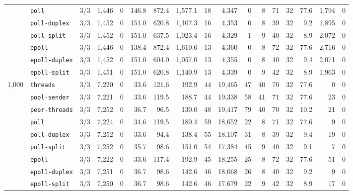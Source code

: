 \begin{longtable}{@{}llrrrrrrrrrrrrrrr@{}}
 & \texttt{poll} & 3/3 & 1{,}446 & 0 & 146.8 & 872.4 & 1{,}577.1 & 18 & 4{,}347 & 0 & 8 & 71 & 32 & 77.6 & 1{,}794 & 0 \\
 & \texttt{poll-duplex} & 3/3 & 1{,}452 & 0 & 151.0 & 620.8 & 1{,}107.3 & 16 & 4{,}353 & 0 & 8 & 39 & 32 & 9.2 & 1{,}895 & 0 \\
 & \texttt{poll-split} & 3/3 & 1{,}452 & 0 & 151.0 & 637.5 & 1{,}023.4 & 16 & 4{,}329 & 1 & 9 & 40 & 32 & 8.9 & 2{,}072 & 0 \\
 & \texttt{epoll} & 3/3 & 1{,}446 & 0 & 138.4 & 872.4 & 1{,}610.6 & 13 & 4{,}360 & 0 & 8 & 72 & 32 & 77.6 & 2{,}716 & 0 \\
 & \texttt{epoll-duplex} & 3/3 & 1{,}452 & 0 & 151.0 & 604.0 & 1{,}057.0 & 13 & 4{,}355 & 0 & 8 & 40 & 32 & 9.4 & 2{,}071 & 0 \\
 & \texttt{epoll-split} & 3/3 & 1{,}451 & 0 & 151.0 & 620.8 & 1{,}140.9 & 13 & 4{,}339 & 0 & 9 & 42 & 32 & 8.9 & 1{,}963 & 0 \\
\midrule
1{,}000 & \texttt{threads} & 3/3 & 7{,}220 & 0 & 33.6 & 121.6 & 192.9 & 44 & 19{,}465 & 47 & 40 & 70 & 32 & 77.6 & 0 & 0 \\
 & \texttt{pool-sender} & 3/3 & 7{,}221 & 0 & 33.6 & 119.5 & 188.7 & 44 & 19{,}338 & 58 & 41 & 71 & 32 & 77.6 & 23 & 0 \\
 & \texttt{peer-threads} & 3/3 & 7{,}252 & 0 & 36.7 & 96.5 & 130.0 & 48 & 19{,}417 & 79 & 40 & 70 & 32 & 10.2 & 21 & 0 \\
 & \texttt{poll} & 3/3 & 7{,}224 & 0 & 34.6 & 119.5 & 180.4 & 59 & 18{,}652 & 22 & 8 & 71 & 32 & 77.6 & 9 & 0 \\
 & \texttt{poll-duplex} & 3/3 & 7{,}252 & 0 & 33.6 & 94.4 & 138.4 & 55 & 18{,}107 & 31 & 8 & 39 & 32 & 9.4 & 19 & 0 \\
 & \texttt{poll-split} & 3/3 & 7{,}252 & 0 & 35.7 & 98.6 & 151.0 & 54 & 17{,}384 & 45 & 9 & 40 & 32 & 9.1 & 7 & 0 \\
 & \texttt{epoll} & 3/3 & 7{,}222 & 0 & 33.6 & 117.4 & 192.9 & 45 & 18{,}255 & 25 & 8 & 72 & 32 & 77.6 & 51 & 0 \\
 & \texttt{epoll-duplex} & 3/3 & 7{,}251 & 0 & 36.7 & 98.6 & 142.6 & 46 & 18{,}068 & 26 & 8 & 40 & 32 & 9.2 & 9 & 0 \\
 & \texttt{epoll-split} & 3/3 & 7{,}250 & 0 & 36.7 & 98.6 & 142.6 & 46 & 17{,}679 & 22 & 9 & 42 & 32 & 8.9 & 17 & 0 \\
\end{longtable}
